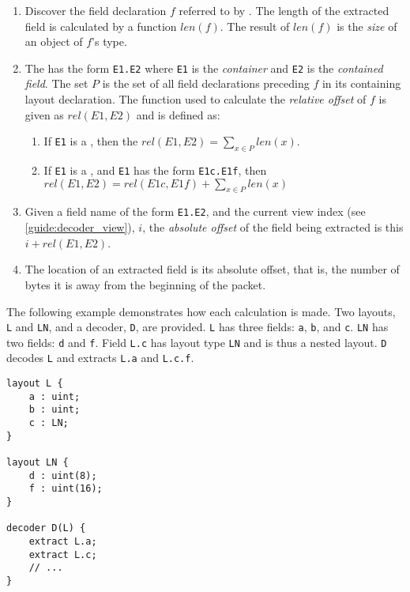 \begin{enumerate}
\item Discover the field declaration $f$ referred to by . The length of the extracted field is calculated by a function $len(f)$. The result of $len(f)$ is the \textit{size} of an object of $f$'s type.

\item The  has the form \texttt{E1.E2} where \texttt{E1} is the \textit{container} and \texttt{E2} is the \textit{contained field}. The set $P$ is the set of all field declarations preceding $f$ in its containing layout declaration. The function used to calculate the \textit{relative offset} of $f$ is given as $rel(E1, E2)$ and is defined as:

\begin{enumerate}

\item If \texttt{E1} is a , then the $rel(E1, E2) = \sum_{x \in P}{} len(x)$.

\item If \texttt{E1} is a , and \texttt{E1} has the form \texttt{E1c.E1f}, then $rel(E1, E2) = rel(E1c, E1f) + \sum_{x \in P}{} len(x)$

\end{enumerate}

\item Given a field name of the form \texttt{E1.E2}, and the current view index (see \ref{guide:decoder_view}), $i$, the \textit{absolute offset} of the field being extracted is this $i + rel(E1, E2)$.

\item The location of an extracted field is its absolute offset, that is, the number of bytes it is away from the beginning of the packet.
\end{enumerate}

The following example demonstrates how each calculation is made. Two layouts, \texttt{L} and \texttt{LN}, and a decoder, \texttt{D}, are provided. \texttt{L} has three fields: \texttt{a}, \texttt{b}, and \texttt{c}.  \texttt{LN} has two fields: \texttt{d} and \texttt{f}. Field \texttt{L.c} has layout type \texttt{LN} and is thus a nested layout. \texttt{D} decodes \texttt{L} and extracts \texttt{L.a} and \texttt{L.c.f}.

\begin{minip}
\begin{lstlisting}
layout L {
	a : uint;
	b : uint;
	c : LN;
}

layout LN {
	d : uint(8);
	f : uint(16);
}

decoder D(L) {
	extract L.a;
	extract L.c;
	// ...
}
\end{lstlisting}
\end{minip}

